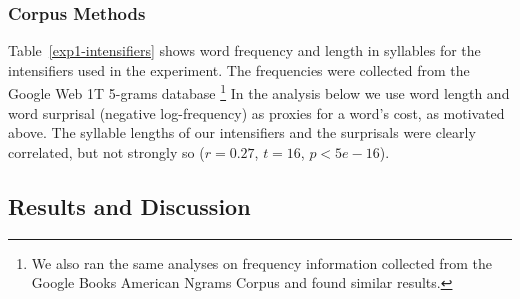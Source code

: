 \documentclass[10pt,letterpaper]{article}
\newcommand{\todo}[1]{{\color{red}#1}}
\begin{document}

\subsubsection{Corpus Methods}

Table~\ref{exp1-intensifiers} shows word frequency and length in syllables for the intensifiers used in the experiment.
The frequencies were collected from the Google Web 1T 5-grams database \cite{web1t5gram}\footnote{
We also ran the same analyses on frequency information collected from the Google Books American Ngrams Corpus \cite{books2011} and found similar results.
}
In the analysis below we use word length and word surprisal (negative log-frequency) as proxies for a word's cost, as motivated above.
The syllable lengths of our intensifiers and the surprisals %
were clearly correlated, but not strongly so ($r = 0.27$, $t=16$, $p<5e-16$).

\subsection{Results and Discussion}
\end{document}
